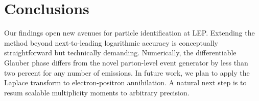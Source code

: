 \section{Conclusions}\label{sec:conclusions}

Our findings open new avenues for particle identification at LEP.
Extending the method beyond next-to-leading logarithmic accuracy is
conceptually straightforward but technically demanding. Numerically, the
differentiable Glauber phase differs from the novel parton-level event
generator by less than two percent for any number of emissions. In
future work, we plan to apply the Laplace transform to electron-positron
annihilation. A natural next step is to resum scalable multiplicity
moments to arbitrary precision.

